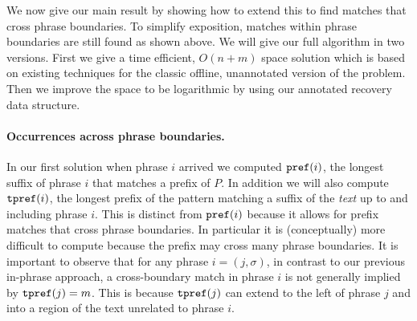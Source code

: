     

We now give our main result by showing how to extend this to find matches that cross phrase boundaries. To simplify exposition, matches within phrase boundaries are still found as shown above. We will give our full algorithm in two versions. First we give a time efficient, $O(n+m)$ space solution which is based on existing techniques for the classic offline, unannotated version of the problem. Then we improve the space to be logarithmic by using our annotated recovery data structure.


\paragraph{Occurrences across phrase boundaries.} In our first solution when phrase $i$ arrived we computed $\mathtt{pref}(i)$, the longest suffix of phrase $i$ that matches a prefix of $P$. In addition we will also compute $\mathtt{tpref}(i)$, the longest prefix of the pattern matching a suffix of the \emph{text} up to and including phrase $i$. This is distinct from  $\mathtt{pref}(i)$ because it allows for prefix matches that cross phrase boundaries. In particular it is (conceptually) more difficult to compute because the prefix may cross many phrase boundaries. It is important to observe that for any phrase $i=(j,\sigma)$, in contrast to our previous in-phrase approach, a cross-boundary match in phrase $i$ is not generally implied by $\mathtt{tpref}(j)=m$. This is because $\mathtt{tpref}(j)$ can extend to the left of phrase $j$ and into a region of the text unrelated to phrase $i$.

